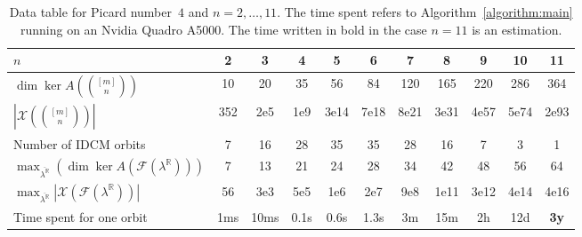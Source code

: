 \documentclass[11pt]{amsart}
\theoremstyle{plain}
\numberwithin{equation}{section}
\theoremstyle{definition}
\newcommand{\cF}{\mathcal{F}}
\newcommand{\cX}{\mathcal{X}}
\newcommand{\R}{\mathbb{R}}
\begin{document}
 
\begin{table}[ht]
	\begin{tabular}{lcccccccccc}
		\toprule
		$n$                                                                     &  2  &  3   &  4   &  5   &  6   &  7  &  8   &  9   &   10   &     11      \tabularnewline \midrule
		$\dim \ker A\left(\binom{[m]}{n}\right)$                                & 10  &   20   &  35    &   56   &   84   &  120   &    165  &   220   &   286     &     364        \tabularnewline
		$|\cX \left(\binom{[m]}{n}\right)|$                                     &  352   &  2e5    &  1e9    &   3e14   &  7e18    &  8e21   &  3e31    &    4e57  &   5e74     &    2e93         \tabularnewline \midrule
		Number of IDCM orbits                                                   &  7  &  16  &  28  &  35  &  35  & 28  &  16  &  7   &   3    &      1      \tabularnewline
		$\max_{\overline{\lambda^\R}}(\dim\ker A(\cF(\lambda^\R)))$ &  7  &  13  &  21  &  24  &  28  & 34  &  42  &  48  &   56   &     64      \tabularnewline
		$\max_{\overline{\lambda^\R}} |\cX(\cF(\lambda^\R))|$ & 56  & 3e3  & 5e5  & 1e6  & 2e7  & 9e8 & 1e11 & 3e12 & 4e14 &   4e16    \tabularnewline \midrule
		Time spent for one orbit                                                & 1ms & 10ms & 0.1s & 0.6s & 1.3s & 3m  & 15m  &  2h  &  12d   & \textbf{3y} \tabularnewline \bottomrule
	\end{tabular}
	\vspace*{0.2cm}
	\caption{Data table for Picard number~$4$ and $n=2,\ldots,11$. The time spent refers to Algorithm~\ref{algorithm:main} running on an Nvidia Quadro A5000. The time written in bold in the case $n=11$ is an estimation.} \label{table:table_IDCM}
\end{table}
\end{document}
